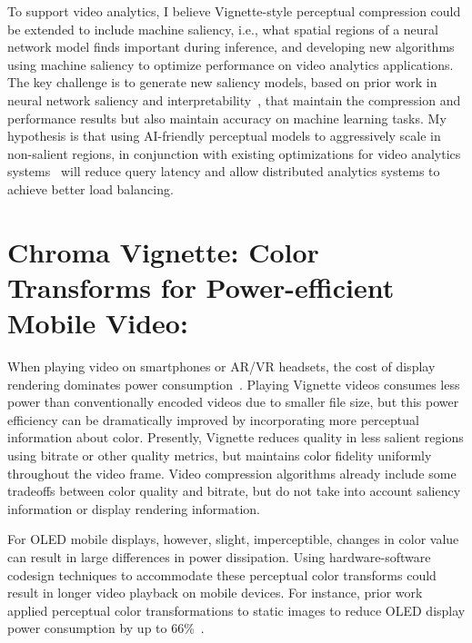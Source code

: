 To support video analytics, I believe Vignette-style perceptual compression could be extended to include machine saliency, i.e., what spatial regions of a neural network model finds important during inference, and developing new algorithms using machine saliency to optimize performance on video analytics applications.
The key challenge is to generate new saliency models, based on prior work in neural network saliency and interpretability~\cite{Simonyan2013DeepIC,Zeiler2014VisualizingAU,Zintgraf2017VisualizingDN}, that maintain the compression and performance results but also maintain accuracy on machine learning tasks.
My hypothesis is that using AI-friendly perceptual models to aggressively scale in non-salient regions, in conjunction with existing optimizations for video analytics systems~\cite{videostorm, chameleon18sigcomm, focus18osdi} will reduce query latency and allow distributed analytics systems to achieve better load balancing.

\section{Chroma Vignette: Color Transforms for Power-efficient Mobile Video:}
\label{sec:chroma-vign}
When playing video on smartphones or AR/VR headsets, the cost of display rendering dominates power consumption~\cite{likamwa-apsys}.
Playing Vignette videos consumes less power than conventionally encoded videos due to smaller file size, but this power efficiency can be dramatically improved by incorporating more perceptual information about color.
Presently, Vignette reduces quality in less salient regions using bitrate or other quality metrics, but maintains color fidelity uniformly throughout the video frame.
Video compression algorithms already include some tradeoffs between color quality and bitrate, but do not take into account saliency information or display rendering information.

For OLED mobile displays, however, slight, imperceptible, changes in color value can result in large differences in power dissipation.
Using hardware-software codesign techniques to accommodate these perceptual color transforms could result in longer video playback on mobile devices.
For instance, prior work applied perceptual color transformations to static images to reduce OLED display power consumption by up to 66\%~\cite{crayon, stanley2018perceived}.

